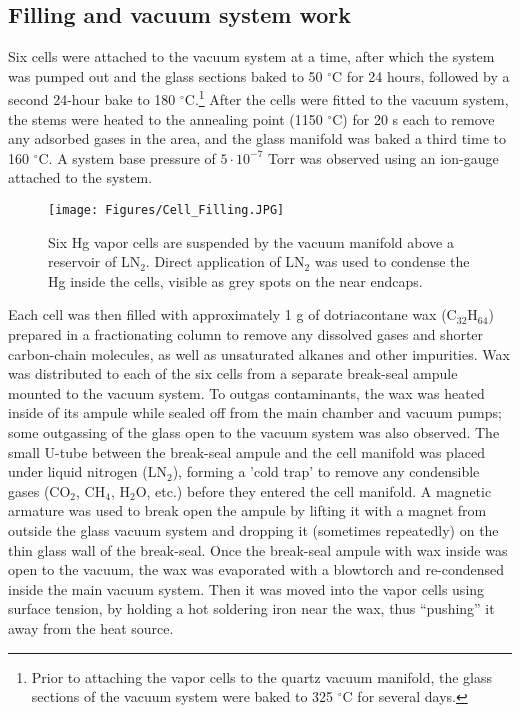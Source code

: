 \documentclass [10pt, twoside] {uwthesis}[2012/04/02]
\begin{document}
\subsection{Filling and vacuum system work}
Six cells were attached to the vacuum system at a time, after which the system was pumped out and the glass sections baked to 50 $^{\circ}$C for 24 hours, followed by a second 24-hour bake to 180 $^{\circ}$C.\footnote{Prior to attaching the vapor cells to the quartz vacuum manifold, the glass sections of the vacuum system were baked to 325 $^{\circ}$C for several days.} After the cells were fitted to the vacuum system, the stems were heated to the annealing point (1150 $^{\circ}$C) for 20 s each to remove any adsorbed gases in the area, and the glass manifold was baked a third time to 160 $^{\circ}$C. A system base pressure of $5\cdot10^{-7}$ Torr was observed using an ion-gauge attached to the system.

\begin{figure}
\begin{center}
\texttt{[image: Figures/Cell\_Filling.JPG]}
\end{center}
\caption[Vapor cells on vacuum manifold]%
{\narrower Six Hg vapor cells are suspended by the vacuum manifold above a reservoir of LN$_2$. Direct application of LN$_2$ was used to condense the Hg inside the cells, visible as grey spots on the near endcaps.}
\label{HgFilling}
\end{figure}

Each cell was then filled with approximately 1 g of dotriacontane wax (C$_{32}$H$_{64}$) prepared in a fractionating column to remove any dissolved gases and shorter carbon-chain molecules, as well as unsaturated alkanes and other impurities. Wax was distributed to each of the six cells from a separate break-seal ampule mounted to the vacuum system. To outgas contaminants, the wax was heated inside of its ampule while sealed off from the main chamber and vacuum pumps; some outgassing of the glass open to the vacuum system was also observed. The small U-tube between the break-seal ampule and the cell manifold was placed under liquid nitrogen (LN$_2$), forming a 'cold trap' to remove any condensible gases (CO$_2$, CH$_4$, H$_2$O, etc.) before they entered the cell manifold. A magnetic armature was used to break open the ampule by lifting it with a magnet from outside the glass vacuum system and dropping it (sometimes repeatedly) on the thin glass wall of the break-seal. Once the break-seal ampule with wax inside was open to the vacuum, the wax was evaporated with a blowtorch and re-condensed inside the main vacuum system. Then it was moved into the vapor cells using surface tension, by holding a hot soldering iron near the wax, thus ``pushing'' it away from the heat source.
\end{document}
